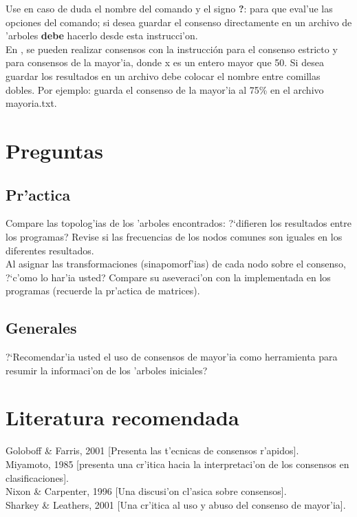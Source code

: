 Use en caso de duda el nombre del comando y el signo \textbf{?}:  
para que eval'ue las opciones del comando; si desea guardar el consenso directamente en un archivo de 'arboles \textbf{debe} hacerlo desde esta instrucci'on.\\
En , se pueden realizar consensos con la instrucci\'on 
para el consenso estricto y  para consensos de la mayor'ia, donde x es un entero mayor que 50. Si desea guardar los resultados en un archivo debe colocar el nombre entre comillas dobles. Por ejemplo:
guarda el consenso de la mayor'ia al 75\% en el archivo mayoria.txt.
\section{Preguntas}
\subsection{Pr'actica}
\noindent
Compare las topolog'ias de los 'arboles encontrados: ?`difieren los resultados entre los programas? Revise si las frecuencias de los nodos comunes son iguales en los diferentes resultados.\\
Al asignar las transformaciones (sinapomorf'ias) de cada nodo sobre el consenso, ?`c'omo lo har'ia usted? Compare su aseveraci'on con la implementada en los programas (recuerde la pr'actica de matrices).
\subsection{Generales}
\noindent
?`Recomendar'ia usted el uso de consensos de mayor'ia como herramienta para resumir la informaci'on de los 'arboles iniciales?
\section{Literatura recomendada}
\noindent
Goloboff \& Farris, 2001 [Presenta las t'ecnicas de consensos r'apidos].\\
Miyamoto, 1985 [presenta una cr'itica hacia la interpretaci'on de los consensos en clasificaciones].\\
Nixon \& Carpenter, 1996 [Una discusi'on cl'asica sobre consensos].\\
Sharkey \& Leathers, 2001 [Una cr'itica al uso y abuso del consenso de mayor'ia].

